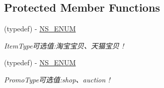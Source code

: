 \subsection*{Protected Member Functions}
\begin{DoxyCompactItemize}
\item 
\mbox{\label{interface_a_l_b_b_trade_test_data_aaad2e45f8da2d18fd932b4cbbe37c759}} 
(typedef) -\/ \mbox{\hyperlink{interface_a_l_b_b_trade_test_data_aaad2e45f8da2d18fd932b4cbbe37c759}{N\+S\+\_\+\+E\+N\+UM}}
\begin{DoxyCompactList}\small\item\em Item\+Type可选值\+:淘宝宝贝、天猫宝贝 ! \end{DoxyCompactList}\item 
\mbox{\label{interface_a_l_b_b_trade_test_data_ab333e5f079257a357c90877f4d80a7e2}} 
(typedef) -\/ \mbox{\hyperlink{interface_a_l_b_b_trade_test_data_ab333e5f079257a357c90877f4d80a7e2}{N\+S\+\_\+\+E\+N\+UM}}
\begin{DoxyCompactList}\small\item\em Promo\+Type可选值\+:shop、auction ! \end{DoxyCompactList}\end{DoxyCompactItemize}
